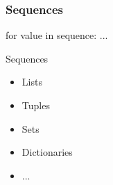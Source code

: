 \begin{frame}[fragile]
\frametitle{Sequences}

\begin{python}
for value in sequence:
    ...
\end{python}

\begin{block}{Sequences}
\begin{itemize}
\item Lists
\item Tuples
\item Sets
\item Dictionaries
\item ...
\end{itemize}
\end{block}
\end{frame}



